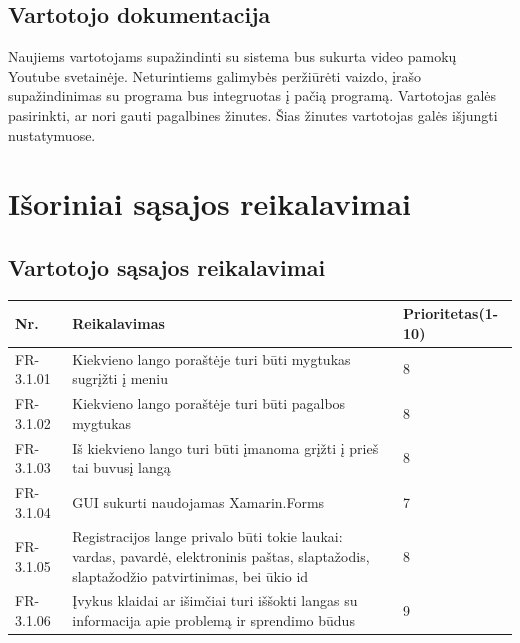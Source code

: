 \documentclass[oneside]{VUMIFPSkursinis}
\begin{document}
\subsection{Vartotojo dokumentacija}
Naujiems vartotojams supažindinti su sistema bus sukurta video pamokų Youtube svetainėje. Neturintiems galimybės peržiūrėti vaizdo, įrašo supažindinimas su programa bus integruotas į pačią programą. Vartotojas galės pasirinkti, ar nori gauti pagalbines žinutes. Šias žinutes vartotojas galės išjungti nustatymuose. 

\section{Išoriniai sąsajos reikalavimai}
\subsection{Vartotojo sąsajos reikalavimai}
\begin{table}[htbp]
	\begin{tabularx}{1\textwidth}{ |P{2.5cm}|X|P{3cm }| }  \hline
		Nr. & Reikalavimas & Prioritetas(1-10) \\ \hline
		FR-3.1.01 & Kiekvieno lango poraštėje turi būti mygtukas sugrįžti į meniu & 8 \\ \hline
		FR-3.1.02 & Kiekvieno lango poraštėje turi būti pagalbos mygtukas & 8 \\ \hline
		FR-3.1.03 & Iš kiekvieno lango turi būti įmanoma grįžti į prieš tai buvusį langą & 8 \\ \hline
		FR-3.1.04 & GUI sukurti naudojamas Xamarin.Forms & 7 \\ \hline
		FR-3.1.05 & Registracijos lange privalo būti tokie laukai: vardas, pavardė, elektroninis paštas, slaptažodis, slaptažodžio patvirtinimas, bei ūkio id & 8 \\ \hline
		FR-3.1.06 & Įvykus klaidai ar išimčiai turi iššokti langas su informacija apie problemą ir sprendimo būdus & 9 \\ \hline
	\end{tabularx}
\end{table}
\end{document}
